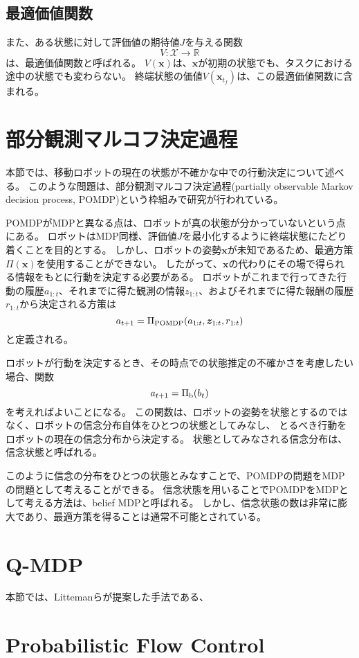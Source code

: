 \subsection{最適価値関数}
また、ある状態に対して評価値の期待値$J$を与える関数
\begin{equation}
\label{value function}
  V : \mathcal{X} \rightarrow \mathbb{R}
\end{equation}
は、最適価値関数と呼ばれる。
$V(\bm{x})$は、$\bm{x}$が初期の状態でも、タスクにおける途中の状態でも変わらない。
終端状態の価値$V(\bm{x}_{t_{f}})$は、この最適価値関数に含まれる。


\section{部分観測マルコフ決定過程}
本節では、移動ロボットの現在の状態が不確かな中での行動決定について述べる。
このような問題は、部分観測マルコフ決定過程(partially observable Markov decision process, POMDP)という枠組みで研究が行われている。

POMDPがMDPと異なる点は、ロボットが真の状態が分かっていないという点にある。
ロボットはMDP同様、評価値$J$を最小化するように終端状態にたどり着くことを目的とする。
しかし、ロボットの姿勢$\bm{x}$が未知であるため、最適方策$\Pi(\bm{x})$を使用することができない。
したがって、$\bm{x}$の代わりにその場で得られる情報をもとに行動を決定する必要がある。
ロボットがこれまで行ってきた行動の履歴$a_{1:t}$、それまでに得た観測の情報$z_{1:t}$、およびそれまでに得た報酬の履歴$r_{1:t}$から決定される方策は
\begin{equation}
\label{policy pomdp}
  a_{t+1} = \Pi_{\rm POMDP} (a_{1:t}, \bm{z}_{1:t}, r_{1:t})
\end{equation}
と定義される。

ロボットが行動を決定するとき、その時点での状態推定の不確かさを考慮したい場合、関数
\begin{equation}
\label{policy belief}
  a_{t+1} = \Pi_{\rm b} (b_{t})
\end{equation}
を考えればよいことになる。
この関数は、ロボットの姿勢を状態とするのではなく、ロボットの信念分布自体をひとつの状態としてみなし、
とるべき行動をロボットの現在の信念分布から決定する。
状態としてみなされる信念分布は、信念状態と呼ばれる。

このように信念の分布をひとつの状態とみなすことで、POMDPの問題をMDPの問題として考えることができる。
信念状態を用いることでPOMDPをMDPとして考える方法は、belief MDPと呼ばれる\cite{kaelbling1998}。
しかし、信念状態の数は非常に膨大であり、最適方策を得ることは通常不可能とされている。


\section{Q-MDP}
本節では、Littemanらが提案した手法である、


\section{Probabilistic Flow Control}
